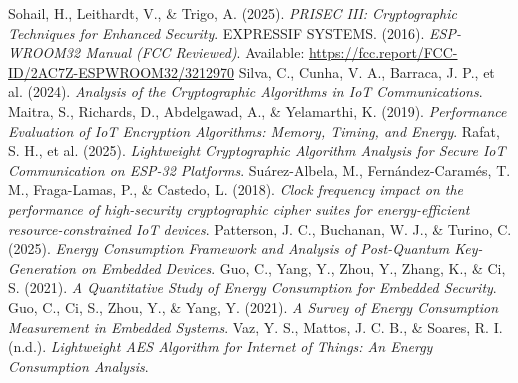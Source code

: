 \documentclass[METI_NISS]{IEEEtran}
\begin{document}
\begin{thebibliography}{10}
 Sohail, H., Leithardt, V., \& Trigo, A. (2025). \textit{PRISEC III: Cryptographic Techniques for Enhanced Security}.
 EXPRESSIF SYSTEMS. (2016). \textit{ESP-WROOM32 Manual (FCC Reviewed)}. Available: \url{https://fcc.report/FCC-ID/2AC7Z-ESPWROOM32/3212970}
 Silva, C., Cunha, V. A., Barraca, J. P., et al. (2024). \textit{Analysis of the Cryptographic Algorithms in IoT Communications}.
 Maitra, S., Richards, D., Abdelgawad, A., \& Yelamarthi, K. (2019). \textit{Performance Evaluation of IoT Encryption Algorithms: Memory, Timing, and Energy}.
 Rafat, S. H., et al. (2025). \textit{Lightweight Cryptographic Algorithm Analysis for Secure IoT Communication on ESP-32 Platforms}.
 Suárez-Albela, M., Fernández-Caramés, T. M., Fraga-Lamas, P., \& Castedo, L. (2018). \textit{Clock frequency impact on the performance of high-security cryptographic cipher suites for energy-efficient resource-constrained IoT devices}.
 Patterson, J. C., Buchanan, W. J., \& Turino, C. (2025). \textit{Energy Consumption Framework and Analysis of Post-Quantum Key-Generation on Embedded Devices}.
 Guo, C., Yang, Y., Zhou, Y., Zhang, K., \& Ci, S. (2021). \textit{A Quantitative Study of Energy Consumption for Embedded Security}.
 Guo, C., Ci, S., Zhou, Y., \& Yang, Y. (2021). \textit{A Survey of Energy Consumption Measurement in Embedded Systems}.
 Vaz, Y. S., Mattos, J. C. B., \& Soares, R. I. (n.d.). \textit{Lightweight AES Algorithm for Internet of Things: An Energy Consumption Analysis}.
\end{thebibliography}

\vspace{12pt}
\end{document}

